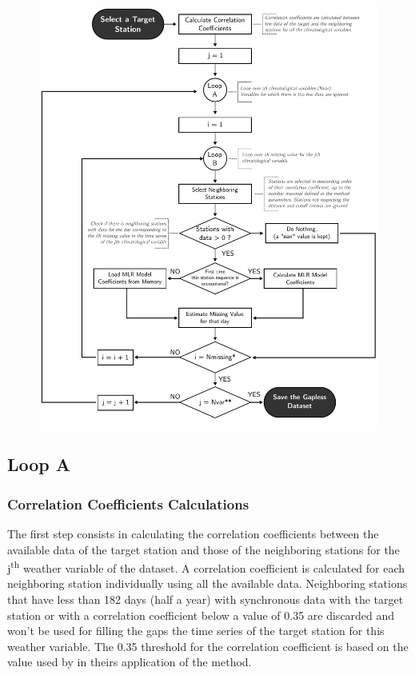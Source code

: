 \documentclass[TechnicalNoteMeteo.tex]{subfiles}
\begin{document}
\begin{figure}[!p]
    \centering
    \includegraphics[width=\textwidth]{img/Flowchart-filling_missing_weather.pdf} 
    \caption{}
    \label{fig:fillworker_flowchart}
\end{figure}

\subsection{Loop A}

\subsubsection{Correlation Coefficients Calculations}

The first step consists in calculating the correlation coefficients between the available data of the target station and those of the neighboring stations for the j\textsuperscript{th} weather variable of the dataset. A correlation coefficient is calculated for each neighboring station individually using all the available data. Neighboring stations that have less than 182 days (half a year) with synchronous data with the target station or with a correlation coefficient below a value of 0.35 are discarded and won't be used for filling the gaps the time series of the target station for this weather variable. The 0.35 threshold for the correlation coefficient is based on the value used by \cite{eischeid_creating_2000} in theirs application of the method. 
\end{document}

